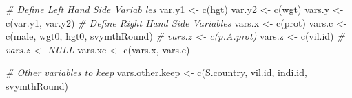 \documentclass[
]{book}
\newenvironment{Shaded}{\begin{snugshade}}{\end{snugshade}}
\newcommand{\CommentTok}[1]{\textcolor[rgb]{0.56,0.35,0.01}{\textit{#1}}}
\newcommand{\FunctionTok}[1]{\textcolor[rgb]{0.00,0.00,0.00}{#1}}
\newcommand{\NormalTok}[1]{#1}
\newcommand{\OtherTok}[1]{\textcolor[rgb]{0.56,0.35,0.01}{#1}}
\newcommand{\StringTok}[1]{\textcolor[rgb]{0.31,0.60,0.02}{#1}}
\begin{document}
\begin{Shaded}
\begin{Highlighting}[]
\CommentTok{\# Define Left Hand Side Variab les}
\NormalTok{var.y1 }\OtherTok{\textless{}{-}} \FunctionTok{c}\NormalTok{(}\StringTok{\textquotesingle{}hgt\textquotesingle{}}\NormalTok{)}
\NormalTok{var.y2 }\OtherTok{\textless{}{-}} \FunctionTok{c}\NormalTok{(}\StringTok{\textquotesingle{}wgt\textquotesingle{}}\NormalTok{)}
\NormalTok{vars.y }\OtherTok{\textless{}{-}} \FunctionTok{c}\NormalTok{(var.y1, var.y2)}
\CommentTok{\# Define Right Hand Side Variables}
\NormalTok{vars.x }\OtherTok{\textless{}{-}} \FunctionTok{c}\NormalTok{(}\StringTok{\textquotesingle{}prot\textquotesingle{}}\NormalTok{)}
\NormalTok{vars.c }\OtherTok{\textless{}{-}} \FunctionTok{c}\NormalTok{(}\StringTok{\textquotesingle{}male\textquotesingle{}}\NormalTok{, }\StringTok{\textquotesingle{}wgt0\textquotesingle{}}\NormalTok{, }\StringTok{\textquotesingle{}hgt0\textquotesingle{}}\NormalTok{, }\StringTok{\textquotesingle{}svymthRound\textquotesingle{}}\NormalTok{)}
\CommentTok{\# vars.z \textless{}{-} c(\textquotesingle{}p.A.prot\textquotesingle{})}
\NormalTok{vars.z }\OtherTok{\textless{}{-}} \FunctionTok{c}\NormalTok{(}\StringTok{\textquotesingle{}vil.id\textquotesingle{}}\NormalTok{)}
\CommentTok{\# vars.z \textless{}{-} NULL}
\NormalTok{vars.xc }\OtherTok{\textless{}{-}} \FunctionTok{c}\NormalTok{(vars.x, vars.c)}

\CommentTok{\# Other variables to keep}
\NormalTok{vars.other.keep }\OtherTok{\textless{}{-}} \FunctionTok{c}\NormalTok{(}\StringTok{\textquotesingle{}S.country\textquotesingle{}}\NormalTok{, }\StringTok{\textquotesingle{}vil.id\textquotesingle{}}\NormalTok{, }\StringTok{\textquotesingle{}indi.id\textquotesingle{}}\NormalTok{, }\StringTok{\textquotesingle{}svymthRound\textquotesingle{}}\NormalTok{)}


\end{Highlighting}
\end{Shaded}
\end{document}
